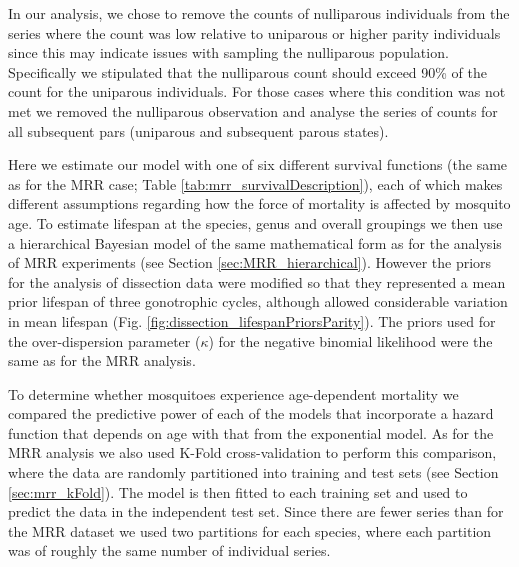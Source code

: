 \documentclass[12pt]{article}
\begin{document}
{In our analysis, we chose to remove the counts of nulliparous individuals from the series where the count was low relative to uniparous or higher parity individuals since this may indicate issues with sampling the nulliparous population. Specifically we stipulated that the nulliparous count should exceed 90\% of the count for the uniparous individuals. For those cases where this condition was not met we removed the nulliparous observation and analyse the series of counts for all subsequent pars (uniparous and subsequent parous states).

Here we estimate our model with one of six different survival functions (the same as for the MRR case; Table \ref{tab:mrr_survivalDescription}), each of which makes different assumptions regarding how the force of mortality is affected by mosquito age. To estimate lifespan at the species, genus and overall groupings we then use a hierarchical Bayesian model of the same mathematical form as for the analysis of MRR experiments (see Section \ref{sec:MRR_hierarchical}). However the priors for the analysis of dissection data were modified so that they represented a mean prior lifespan of three gonotrophic cycles, although allowed considerable variation in mean lifespan (Fig. \ref{fig:dissection_lifespanPriorsParity}). The priors used for the over-dispersion parameter ($\kappa$) for the negative binomial likelihood were the same as for the MRR analysis.

To determine whether mosquitoes experience age-dependent mortality we compared the predictive power of each of the models that incorporate a hazard function that depends on age with that from the exponential model. As for the MRR analysis we also used K-Fold cross-validation to perform this comparison, where the data are randomly partitioned into training and test sets (see Section \ref{sec:mrr_kFold}). The model is then fitted to each training set and used to predict the data in the independent test set. Since there are fewer series than for the MRR dataset we used two partitions for each species, where each partition was of roughly the same number of individual series.

}
\end{document}
